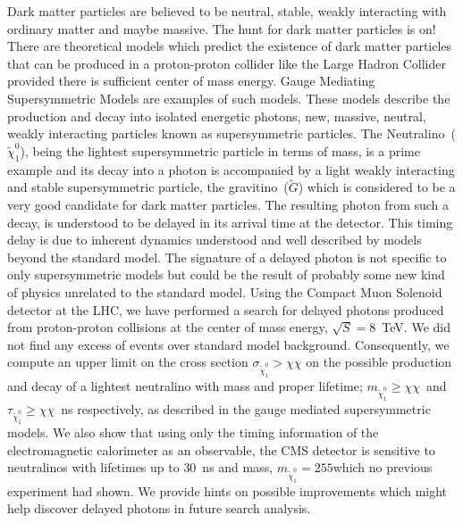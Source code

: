 
Dark matter particles are believed to be neutral, stable, weakly interacting with ordinary matter and maybe massive. The hunt for dark matter particles is on! There are theoretical models which predict the  existence of dark matter particles that can be produced in a proton-proton collider like the Large Hadron Collider provided there is sufficient center of mass energy. Gauge Mediating Supersymmetric Models are examples of such models. These models describe the production and decay into isolated energetic photons, new, massive, neutral, weakly interacting particles known as supersymmetric particles. The Neutralino~($\tilde{\chi}^{0}_{1}$), being the lightest supersymmetric particle in terms of mass, is a prime example and its decay into a photon is accompanied by a light weakly interacting and stable supersymmetric particle, the gravitino~($\tilde{G}$) which is considered to be a very good candidate for dark matter particles. The resulting photon from such a decay, is understood to be delayed in its arrival time at the detector. This timing delay is due to inherent dynamics understood and well described by models beyond the standard model. The signature of a delayed photon is not specific to only supersymmetric models but could be the result of probably some new kind of physics unrelated to the standard model. Using the Compact Muon Solenoid detector at the LHC, we have performed a search for delayed photons produced from proton-proton collisions at the center of mass energy, $\sqrt{S} = 8$~TeV. We did not find any excess of events over standard model background. Consequently, we compute an upper limit on the cross section $\sigma_{\tilde{\chi}^{0}_{1}} > \chi\chi$ on the possible production and decay of a lightest neutralino with  mass and proper lifetime; $m_{\tilde{\chi}^{0}_{1}} \geq \chi\chi$~\GeVcc and $\tau_{\tilde{\chi}^{0}_{1}} \geq \chi\chi$~ns respectively, as described in the gauge mediated supersymmetric models. We also show that using only the timing information of the electromagnetic calorimeter as an observable, the  CMS detector is sensitive to neutralinos with lifetimes up to $30$~ns and mass, $m_{\tilde{\chi}^{0}_{1}} = 255$\GeVcc which no previous experiment had shown. We provide hints on possible improvements which might help discover delayed photons in future search analysis.